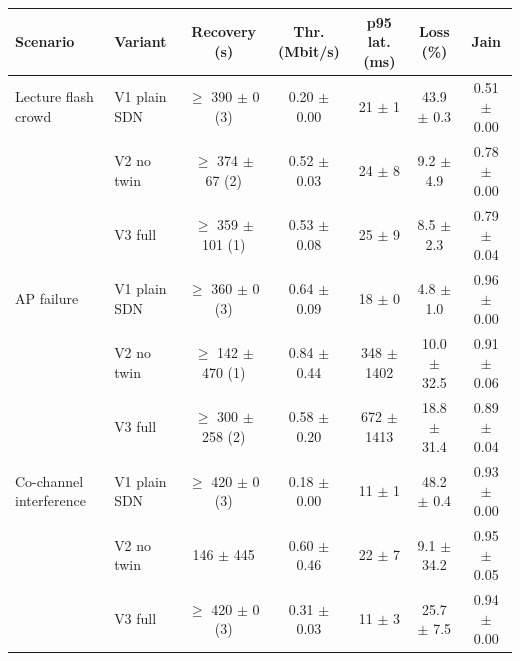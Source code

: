 \begin{tabular}{@{}llccccc@{}}
\toprule
Scenario & Variant & Recovery (s) & Thr. (Mbit/s) & p95 lat. (ms) & Loss (\%) & Jain \\
\midrule
Lecture flash crowd & V1 plain SDN & $\geq$ 390 $\pm$ 0 (3) & 0.20 $\pm$ 0.00 & 21 $\pm$ 1 & 43.9 $\pm$ 0.3 & 0.51 $\pm$ 0.00 \\
 & V2 no twin & $\geq$ 374 $\pm$ 67 (2) & 0.52 $\pm$ 0.03 & 24 $\pm$ 8 & 9.2 $\pm$ 4.9 & 0.78 $\pm$ 0.00 \\
 & V3 full & $\geq$ 359 $\pm$ 101 (1) & 0.53 $\pm$ 0.08 & 25 $\pm$ 9 & 8.5 $\pm$ 2.3 & 0.79 $\pm$ 0.04 \\
\addlinespace
AP failure & V1 plain SDN & $\geq$ 360 $\pm$ 0 (3) & 0.64 $\pm$ 0.09 & 18 $\pm$ 0 & 4.8 $\pm$ 1.0 & 0.96 $\pm$ 0.00 \\
 & V2 no twin & $\geq$ 142 $\pm$ 470 (1) & 0.84 $\pm$ 0.44 & 348 $\pm$ 1402 & 10.0 $\pm$ 32.5 & 0.91 $\pm$ 0.06 \\
 & V3 full & $\geq$ 300 $\pm$ 258 (2) & 0.58 $\pm$ 0.20 & 672 $\pm$ 1413 & 18.8 $\pm$ 31.4 & 0.89 $\pm$ 0.04 \\
\addlinespace
Co-channel interference & V1 plain SDN & $\geq$ 420 $\pm$ 0 (3) & 0.18 $\pm$ 0.00 & 11 $\pm$ 1 & 48.2 $\pm$ 0.4 & 0.93 $\pm$ 0.00 \\
 & V2 no twin & 146 $\pm$ 445 & 0.60 $\pm$ 0.46 & 22 $\pm$ 7 & 9.1 $\pm$ 34.2 & 0.95 $\pm$ 0.05 \\
 & V3 full & $\geq$ 420 $\pm$ 0 (3) & 0.31 $\pm$ 0.03 & 11 $\pm$ 3 & 25.7 $\pm$ 7.5 & 0.94 $\pm$ 0.00 \\
\bottomrule
\end{tabular}

